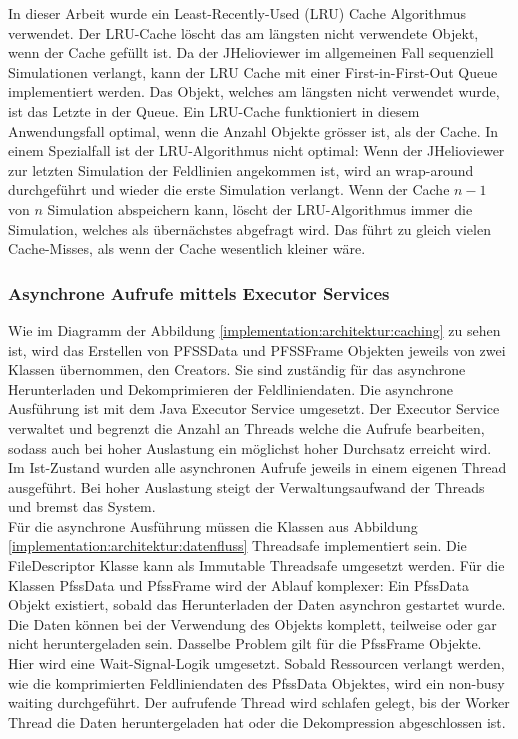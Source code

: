 In dieser Arbeit wurde ein Least-Recently-Used (LRU) Cache Algorithmus verwendet. Der LRU-Cache löscht das am längsten nicht verwendete Objekt, wenn der Cache gefüllt ist. Da der JHelioviewer im allgemeinen Fall sequenziell Simulationen verlangt, kann der LRU Cache mit einer First-in-First-Out Queue implementiert werden. Das Objekt, welches am längsten nicht  verwendet wurde, ist das Letzte in der Queue. Ein LRU-Cache funktioniert in diesem Anwendungsfall optimal, wenn die Anzahl Objekte grösser ist, als der Cache. In einem Spezialfall ist der LRU-Algorithmus nicht optimal: Wenn der JHelioviewer zur letzten Simulation der Feldlinien angekommen ist, wird an wrap-around durchgeführt und wieder die erste Simulation verlangt. Wenn der Cache $n-1$ von $n$ Simulation abspeichern kann, löscht der LRU-Algorithmus immer die Simulation, welches als übernächstes abgefragt wird. Das führt zu gleich vielen Cache-Misses, als wenn der Cache wesentlich kleiner wäre.

\subsubsection{Asynchrone Aufrufe mittels Executor Services}
Wie im Diagramm der Abbildung \ref{implementation:architektur:caching} zu sehen ist, wird das Erstellen von PFSSData und PFSSFrame Objekten jeweils von zwei Klassen übernommen, den Creators. Sie sind zuständig für das asynchrone Herunterladen und Dekomprimieren der Feldliniendaten. Die asynchrone Ausführung ist mit dem Java Executor Service umgesetzt. Der Executor Service verwaltet und begrenzt die Anzahl an Threads welche die Aufrufe bearbeiten, sodass auch bei hoher Auslastung ein möglichst hoher Durchsatz erreicht wird. Im Ist-Zustand wurden alle asynchronen Aufrufe jeweils in einem eigenen Thread ausgeführt. Bei hoher Auslastung steigt der Verwaltungsaufwand der Threads und bremst das System.\\
Für die asynchrone Ausführung müssen die Klassen aus Abbildung \ref{implementation:architektur:datenfluss} Threadsafe implementiert sein. Die FileDescriptor Klasse kann als Immutable Threadsafe umgesetzt werden. Für die Klassen PfssData und PfssFrame wird der Ablauf komplexer: Ein PfssData Objekt existiert, sobald das Herunterladen der Daten asynchron gestartet wurde. Die Daten können bei der Verwendung des Objekts komplett, teilweise oder gar nicht heruntergeladen sein. Dasselbe Problem gilt für die PfssFrame Objekte. Hier wird eine Wait-Signal-Logik umgesetzt. Sobald Ressourcen verlangt werden, wie die komprimierten Feldliniendaten des PfssData Objektes, wird ein non-busy waiting durchgeführt. Der aufrufende Thread wird schlafen gelegt, bis der Worker Thread die Daten heruntergeladen hat oder die Dekompression abgeschlossen ist.